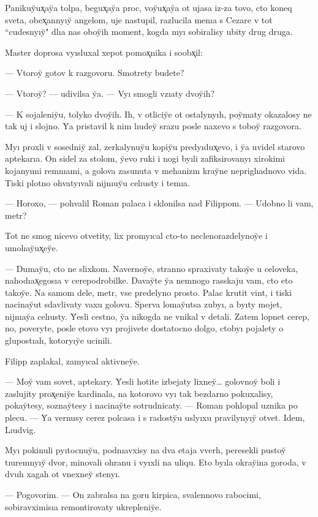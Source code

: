 \documentclass[10pt]{book}
\begin{document}
Panikuy̆ux̨ay̆a tolpa, begux̨ay̆a proc, voy̆ux̨ay̆a ot ujasa iz-za tovo, cto koneq sveta, obex̨annyıy̆ angelom, uje nastupil, razlucila menıa s Cezare v tot ``cudesnyıy̆" dlıa nas oboy̆ih moment, kogda myı sobiralisy ubity drug druga.

Master doprosa vyısluxal xepot pomox̨nika i soobx̨il:

— Vtoroy̆ gotov k razgovoru. Smotrety budete?

— Vtoroy̆? — udivilsa y̆a. — Vyı smogli vzıaty dvoy̆ih?

— K sojaleniy̆u, tolyko dvoy̆ih. Ih, v otliciy̆e ot ostalynyıh, poy̆maty okazalosy ne tak uj i slojno. Y̆a pristavil k nim lıudey̆ srazu posle naxevo s toboy̆ razgovora.

Myı proxli v sosedniy̆ zal, zerkalynuy̆u kopiy̆u predyıdux̨evo, i y̆a uvidel starovo aptekarıa. On sidel za stolom, y̆evo ruki i nogi byıli zafiksirovanyı xirokimi kojanyımi remnıami, a golova zasunuta v mehanizm kray̆ne nepriglıadnovo vida. Tiski plotno ohvatyıvali nijnıuy̆u celıusty i temıa.

— Horoxo, — pohvalil Roman palaca i sklonilsa nad Filippom. — Udobno li vam, metr?

Tot ne smog nicevo otvetity, lix promyıcal cto-to neclenorazdelynoy̆e i umolıay̆ux̨ey̆e.

— Dumay̆u, cto ne slixkom. Navernoy̆e, stranno spraxivaty takoy̆e u celoveka, nahodıax̨egosıa v cerepodrobilke. Davay̆te y̆a nemnogo rasskaju vam, cto eto takoy̆e. Na samom dele, metr, vse predelyno prosto. Palac krutit vint, i tiski nacinay̆ut sdavlivaty vaxu golovu. Sperva lomay̆utsa zubyı, a byıty mojet, nijnıay̆a celıusty. Y̆esli cestno, y̆a nikogda ne vnikal v detali. Zatem lopnet cerep, no, poveryte, posle etovo vyı projivete dostatocno dolgo, ctobyı pojalety o glupostıah, kotoryıy̆e ucinili.

Filipp zaplakal, zamyıcal aktivney̆e.

— Moy̆ vam sovet, aptekary. Y̆esli hotite izbejaty lixney̆… golovnoy̆ boli i zaslujity prox̨eniy̆e kardinala, na kotorovo vyı tak bezdarno pokuxalisy, pokay̆tesy, soznay̆tesy i nacinay̆te sotrudnicaty. — Roman pohlopal uznika po plecu. — Y̆a vernusy cerez polcasa i s radosty̆u uslyıxu pravilynyıy̆ otvet. Idem, Lıudvig.

Myı pokinuli pyıtocnuy̆u, podnıavxisy na dva etaja vverh, peresekli pustoy̆ tıuremnyıy̆ dvor, minovali ohranu i vyıxli na uliqu. Eto byıla okray̆ina goroda, v dvuh xagah ot vnexney̆ stenyı.

— Pogovorim. — On zabralsa na goru kirpica, svalennovo rabocimi, sobiravximisıa remontirovaty ukrepleniy̆e.
\end{document}
